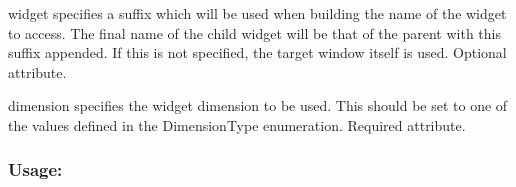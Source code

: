 \begin{DoxyItemize}
\item {\ttfamily widget} specifies a suffix which will be used when building the name of the widget to access. The final name of the child widget will be that of the parent with this suffix appended. If this is not specified, the target window itself is used. Optional attribute. \item {\ttfamily dimension} specifies the widget dimension to be used. This should be set to one of the values defined in the Dimension\+Type enumeration. Required attribute.\end{DoxyItemize}
\hypertarget{fal_element_ref_fal_elem_ref_sec_38_3}{}\subsubsection{Usage\+:}\label{fal_element_ref_fal_elem_ref_sec_38_3}

